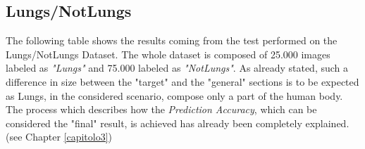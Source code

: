 \documentclass[../main.tex]{subfiles}
\begin{document}
\begin{table}
\caption{\textit{Lungs/Not Lungs} Results}
\label{tab:LNLres}

\end{table}


\subsection{Lungs/NotLungs}
The following table shows the results coming from the test performed on the Lungs/NotLungs Dataset. The whole dataset is composed of 25.000 images labeled as \textit{"Lungs"} and 75.000 labeled as \textit{"NotLungs"}. As already stated, such a difference in size between the "target" and the "general" sections is to be expected as Lungs, in the considered scenario, compose only a part of the human body. The process which describes how the \textit{Prediction Accuracy}, which can be considered the "final" result, is achieved has already been completely explained.(see Chapter \ref{capitolo3})
\end{document}
